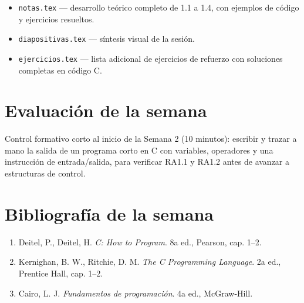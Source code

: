 \documentclass[11pt,letterpaper]{article}
\begin{document}
\begin{itemize}[leftmargin=1.2cm]
  \item \texttt{notas.tex} --- desarrollo teórico completo de 1.1 a 1.4, con ejemplos de código y
        ejercicios resueltos.
  \item \texttt{diapositivas.tex} --- síntesis visual de la sesión.
  \item \texttt{ejercicios.tex} --- lista adicional de ejercicios de refuerzo con soluciones
        completas en código C.
\end{itemize}

\section{Evaluación de la semana}

Control formativo corto al inicio de la Semana 2 (10 minutos): escribir y trazar a mano la salida
de un programa corto en C con variables, operadores y una instrucción de entrada/salida, para
verificar RA1.1 y RA1.2 antes de avanzar a estructuras de control.

\section{Bibliografía de la semana}

\begin{enumerate}[leftmargin=1.2cm]
  \item Deitel, P., Deitel, H. \emph{C: How to Program}. 8a ed., Pearson, cap. 1--2.
  \item Kernighan, B. W., Ritchie, D. M. \emph{The C Programming Language}. 2a ed., Prentice Hall,
        cap. 1--2.
  \item Cairo, L. J. \emph{Fundamentos de programación}. 4a ed., McGraw-Hill.
\end{enumerate}
\end{document}
